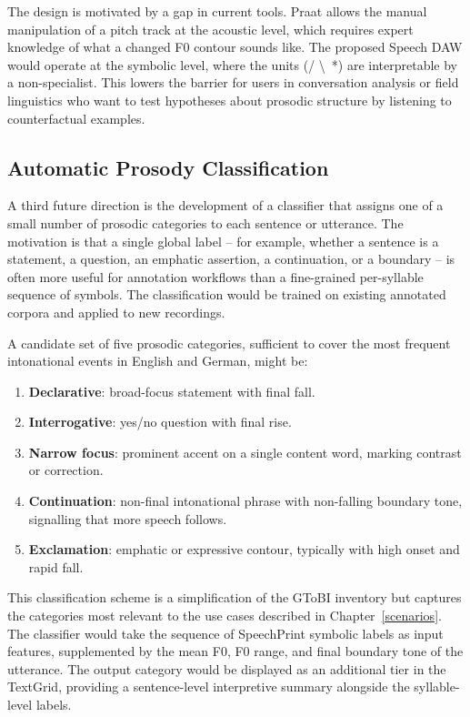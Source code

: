 The design is motivated by a gap in current tools. Praat allows the manual
manipulation of a pitch track at the acoustic level, which requires expert
knowledge of what a changed F0 contour sounds like. The proposed Speech DAW
would operate at the symbolic level, where the units (/ \textbackslash\, *) are
interpretable by a non-specialist. This lowers the barrier for users in
conversation analysis or field linguistics who want to test hypotheses about
prosodic structure by listening to counterfactual examples.

\subsection{Automatic Prosody Classification}
\label{sec:prosody_classifier}

A third future direction is the development of a classifier that assigns one of a
small number of prosodic categories to each sentence or utterance. The motivation
is that a single global label -- for example, whether a sentence is a statement, a
question, an emphatic assertion, a continuation, or a boundary -- is often more
useful for annotation workflows than a fine-grained per-syllable sequence of
symbols. The classification would be trained on existing annotated corpora and
applied to new recordings.

A candidate set of five prosodic categories, sufficient to cover the most
frequent intonational events in English and German, might be:
\begin{enumerate}
\item \textbf{Declarative}: broad-focus statement with final fall.
\item \textbf{Interrogative}: yes/no question with final rise.
\item \textbf{Narrow focus}: prominent accent on a single content word,
      marking contrast or correction.
\item \textbf{Continuation}: non-final intonational phrase with
      non-falling boundary tone, signalling that more speech follows.
\item \textbf{Exclamation}: emphatic or expressive contour, typically with
      high onset and rapid fall.
\end{enumerate}

This classification scheme is a simplification of the GToBI inventory but
captures the categories most relevant to the use cases described in
Chapter~\ref{scenarios}. The classifier would take the sequence of SpeechPrint
symbolic labels as input features, supplemented by the mean F0, F0 range, and
final boundary tone of the utterance. The output category would be displayed as
an additional tier in the TextGrid, providing a sentence-level interpretive
summary alongside the syllable-level labels.

